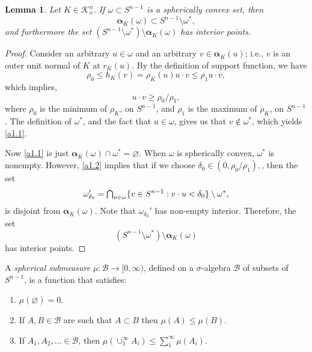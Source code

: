 \documentclass{cpamart1}     %
\newtheorem{lemm}[theo]{Lemma}
\theoremstyle{definition}
\theoremstyle{remark}
\newcommand*{\medcap}{\mathsmaller{\bigcap}}%
\newcommand{\sn}{S^{n-1}}
\newcommand{\kno}{\mathcal K^n_o}
\newcommand{\balpha}{\pmb{\alpha}}
\begin{document}
\begin{lemm}\label{a1}
Let $K\in \kno$. If $\omega \subset \sn$ is a spherically convex set, then
\begin{equation}\label{a1.1}
\balpha_K(\omega) \subset \sn \setminus \omega^*,
\end{equation}
and furthermore the set $(\sn \setminus \omega^*)\setminus \balpha_K(\omega)$ has interior points.
\end{lemm}

\begin{proof}
Consider an arbitrary $u\in \omega$ and an arbitrary $v\in \balpha_K(u)$;
i.e., $v$ is an outer unit normal
of $K$ at $r_K(u)$. By the definition of support function, we have
$$\rho_0\leq h_K(v)=\rho_K(u)u\cdot v\leq \rho_1 u\cdot v,$$
which implies,
\begin{equation}\label{a1.2}
u\cdot v \geq \rho_0/\rho_1,
\end{equation}
where $\rho_0$ is the minimum of $\rho_K$, on $\sn$, and $\rho_1$ is
the maximum of $\rho_K$, on $\sn$.
The definition of $\omega^*$, and the fact that $u\in\omega$, gives us
that $v\notin \omega^*$, which yields \eqref{a1.1}.


Now \eqref{a1.1} is just $\balpha_K(\omega) \cap \omega^*=\varnothing$.
When $\omega$ is spherically convex, $\omega^*$ is nonempty.
However, \eqref{a1.2} implies that if we choose
$\delta_0 \in (0, \rho_0/\rho_1), $, then the set
\[
\omega'_{\delta_0} = \medcap_{u\in \omega}\{v\in \sn: v\cdot u<\delta_0\}\setminus \omega^*,
\]
is disjoint from
$\balpha_K(\omega)$. Note that $\omega_{\delta_0}'$ has non-empty interior. Therefore, the set
$$(\sn \setminus \omega^*)\setminus \balpha_K(\omega)$$ has interior points.
\end{proof}






A {\it spherical submeasure} $\mu: \mathcal{B} \to [0,\infty)$, defined on a
$\sigma$-algebra $\mathcal{B}$ of subsets of $\sn$, is a function that satisfies: 

\begin{enumerate}
\item 
$\mu(\varnothing)=0$. 
\item 
If $A, B \in \mathcal{B}$ are such that $A\subset B$ then $\mu(A)\le \mu(B)$.
\item 
If $A_1, A_2,\ldots \in \mathcal{B}$, then $\mu(\cup_1^\infty A_i) \le \sum_1^\infty \mu(A_i)$.
\end{enumerate}
\end{document}
